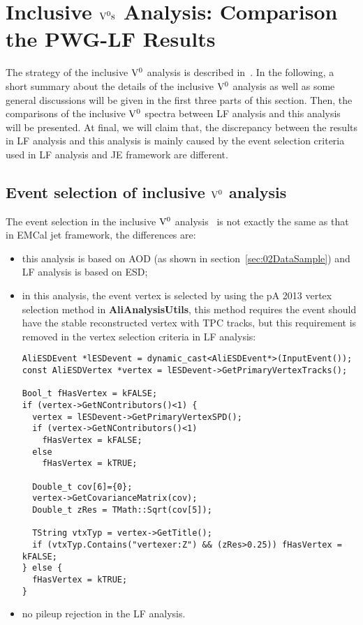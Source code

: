 \section{Inclusive ${\rm V}^{0}{\rm s}$ Analysis: Comparison the PWG-LF Results}
\label{sec:c03InclusiveV0s}

The strategy of the inclusive ${\rm V}^{0}$ analysis is described
in~\cite{Ali2012:ana501,Ali2013:ana702}.
In the following,
a short summary about the details of the inclusive ${\rm V}^{0}$ analysis
as well as some general discussions will be given
in the first three parts of this section.
Then, the comparisons of the inclusive ${\rm V}^{0}$ spectra between
LF analysis and this analysis will be presented.
At final, we will claim that,
the discrepancy between the results in LF analysis and this analysis
is mainly caused by the event selection criteria used in LF analysis and
JE framework are different.

\subsection{Event selection of inclusive ${\rm V}^{0}$ analysis}
\label{sec:c03EventSel}

The event selection in the inclusive ${\rm V}^{0}$
analysis~\cite{Ali2012:ana501,Ali2013:ana702}
is not exactly the same
as that in EMCal jet framework,
the differences are:
\begin{itemize}
\item this analysis is based on AOD (as shown in
      section~\ref{sec:02DataSample}) and LF analysis is based on ESD;
\item in this analysis,
      the event vertex is selected by using the pA 2013 vertex selection
      method in {\bf AliAnalysisUtils},
      this method requires the event should have the stable reconstructed
      vertex with TPC tracks,
      but this requirement is removed in the vertex selection criteria
      in LF analysis:
      \begin{lstlisting}
AliESDEvent *lESDevent = dynamic_cast<AliESDEvent*>(InputEvent());
const AliESDVertex *vertex = lESDevent->GetPrimaryVertexTracks();

Bool_t fHasVertex = kFALSE;
if (vertex->GetNContributors()<1) {
  vertex = lESDevent->GetPrimaryVertexSPD();
  if (vertex->GetNContributors()<1)
    fHasVertex = kFALSE;
  else
    fHasVertex = kTRUE;

  Double_t cov[6]={0};
  vertex->GetCovarianceMatrix(cov);
  Double_t zRes = TMath::Sqrt(cov[5]);

  TString vtxTyp = vertex->GetTitle();
  if (vtxTyp.Contains("vertexer:Z") && (zRes>0.25)) fHasVertex = kFALSE;
} else {
  fHasVertex = kTRUE;
}
      \end{lstlisting}
\item no pileup rejection in the LF analysis.
\end{itemize}

